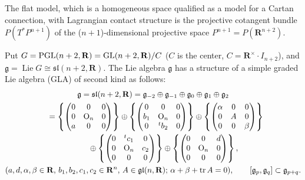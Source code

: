 \documentclass[11pt]{article}
\begin{document}
The f\/lat model, which is a homogeneous space qualif\/ied as a model
for a Cartan connection, with Lagrangian contact structure is
the projective cotangent bundle $P(T^*P^{n+1})$
of the ($n+1$)-dimensional projective space $P^{n+1}=P(\mathbf{R}^{n+2})$.

Put $G={\rm PGL}(n+2,{\mathbf{R}})={\rm GL}(n+2,{\mathbf{R}})/C$ ($C$ is the center,
$C=\mathbf{R}^{\times}\cdot I_{n+2}$),
and $\mathfrak{g}=\operatorname{Lie} G \cong \mathfrak{sl}(n+2,{\mathbf{R}})$.
The Lie algebra $\mathfrak{g}$ has a structure of
a simple graded Lie algebra (GLA) of second kind as follows:
\begin{gather*}
       {\mathfrak g} = {\mathfrak{sl}}(n+2,{\mathbf{R}})  = {\mathfrak g}_{-2}\oplus {\mathfrak g}_{-1} \oplus
                    {\mathfrak g}_0
                    \oplus {\mathfrak g}_1 \oplus {\mathfrak g}_2 \\
\hphantom{{\mathfrak g}}{}
= \left\{{\begin{pmatrix}
                       0 & 0 & 0 \\
                       0 & \mathrm{O}_n & 0 \\
                       a & 0 & 0
                    \end{pmatrix}}\right\}
                       \oplus
                    \left\{{\begin{pmatrix}
                       0 & 0 & 0 \\
                       b_1 & \mathrm{O}_n & 0 \\
                       0 & {}^tb_2 & 0
                    \end{pmatrix}}\right\}
                       \oplus
                    \left\{{\begin{pmatrix}
                       \alpha & 0 & 0 \\
                       0 & A & 0 \\
                       0 & 0 &\beta
                    \end{pmatrix}}\right\} \\
\hphantom{{\mathfrak g}=}{} \quad {}\oplus
                    \left\{{\begin{pmatrix}
                       0 & {}^tc_1 & 0 \\
                       0 & \mathrm{O}_n & c_2 \\
                       0 & 0 & 0
                    \end{pmatrix}}\right\}
                       \oplus
                    \left\{{\begin{pmatrix}
                       0 & 0 & d \\
                       0 & \mathrm{O}_n & 0 \\
                       0 & 0 & 0
                     \end{pmatrix}}\right\}, \\
  (a,d,\alpha,\beta \in {\mathbf R},\,  b_1,b_2,c_1,c_2\in
                    {\mathbf R}^n, \, A\in \mathfrak{gl}(n,{\mathbf{R}}); \,
                    \alpha +\beta +\operatorname{tr}A=0),
                  \qquad [\mathfrak{g}_p,\mathfrak{g}_q] \subset
                    \mathfrak{g}_{p+q}.
\end{gather*}
\end{document}
